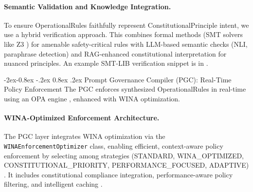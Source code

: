 \documentclass[manuscript,screen,9pt]{acmart}
\makeatletter
\renewcommand\subsubsection{\@startsection{subsubsection}{3}{\z@}%
  {-2ex\@plus -0.8ex \@minus -.2ex}%
  {0.8ex \@plus .2ex}%
  {\normalfont\normalsize\bfseries}}
\makeatother
\begin{document}
\begin{table}[!htb]
\paragraph{Semantic Validation and Knowledge Integration.}
\label{subsubsec:semantic_validation}
To ensure OperationalRules faithfully represent ConstitutionalPrinciple intent, we use a hybrid verification approach. This combines formal methods (SMT solvers like Z3 \cite{Barrett2018SMTSolving, DeMouraZ3}) for amenable safety-critical rules with LLM-based semantic checks (NLI, paraphrase detection) and RAG-enhanced constitutional interpretation for nuanced principles. An example SMT-LIB verification snippet is in .

\subsubsection{Prompt Governance Compiler (PGC): Real-Time Policy Enforcement}
\label{subsubsec:pgc_layer}
The PGC enforces synthesized OperationalRules in real-time using an OPA engine \cite{Sandall2021OPAReference}, enhanced with WINA optimization.

\paragraph{WINA-Optimized Enforcement Architecture.} The PGC layer integrates WINA optimization via the \texttt{WINA\allowbreak Enforcement\allowbreak Optimizer} class, enabling efficient, context-aware policy enforcement by selecting among strategies (STANDARD, WINA\_OPTIMIZED, CONSTITUTIONAL\_PRIORITY, PERFORMANCE\_FOCUSED, ADAPTIVE) \cite{PolicyEnforcementOptimization2024}. It includes constitutional compliance integration, performance-aware policy filtering, and intelligent caching \cite{ConstitutionalCompliance2024, IntelligentCaching2024}.


\end{table}
\end{document}
